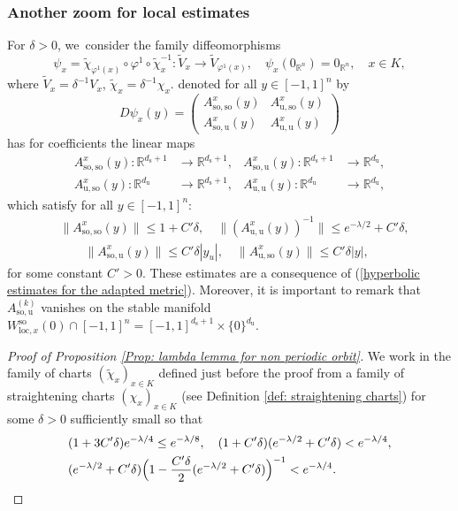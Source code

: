 \documentclass[11pt]{article}
\newcommand{\loc}{\mathrm{loc}}
\newcommand{\rs}{\mathrm{s}}
\newcommand{\rso}{\mathrm{so}}
\newcommand{\ru}{\mathrm{u}}
\theoremstyle{definition}
\theoremstyle{plain}
\newcommand{\R}{\mathbb{R}}
\begin{document}
\begin{appendix}
\subsubsection*{Another zoom for local estimates}
For $\delta > 0$, we~consider the family diffeomorphisms
\[
\psi_{x} = \widetilde{\chi}_{\varphi^1 (x)} \circ \varphi^1 \circ \widetilde{\chi}_x^{-1}: \widetilde{V}_x \to \widetilde{V}_{\varphi^1 (x)}, \quad \psi_{x} (0_{\R^n}) = 0_{\R^n}, \quad x \in K,
\]
where $\widetilde{V}_{x}= \delta^{-1} V_x$, $\widetilde{\chi}_x = \delta^{-1} \chi_x$.
denoted for all $y \in [-1,1]^n$ by
\[
D \psi_{x} (y) = \begin{pmatrix}
A_{\rso,\rso}^{x} (y) & A_{\ru,\rso}^{x} (y) \\
A_{\rso,\ru}^{x} (y) & A_{\ru,\ru}^{x} (y)
\end{pmatrix}
\]
has for coefficients the linear maps
\begin{align*}
A_{\rso,\rso}^{x} (y): \R^{d_\rs + 1} &\to \R^{d_\rs + 1},& A_{\rso,\ru}^{x} (y): \R^{d_\rs + 1} &\to \R^{d_\ru},\\
A_{\ru,\rso}^{x} (y): \R^{d_\ru} &\to \R^{d_\rs + 1},& A_{\ru,\ru}^{x} (y): \R^{d_\ru} &\to \R^{d_\ru},
\end{align*}
which satisfy for all $y \in [-1,1]^n$:
\begin{equation}\label{eq: appendix, estimates differential in adapted chart}
\begin{split}
& \| A_{\rso,\rso}^{x} (y) \|\leq 1 + C' \delta, \quad \| (A_{\ru,\ru}^{x} (y))^{-1} \| \leq e^{- \lambda/2} + C' \delta,\\
&\qquad \| A_{\rso,\ru}^{x} (y) \| \leq C' \delta |y_u|, \quad \| A_{\ru,\rso}^{x} (y) \| \leq C' \delta |y|,
\end{split}
\end{equation}
for some constant $C' > 0$. These estimates are a consequence of (\ref{hyperbolic estimates for the adapted metric}). Moreover, it is important to remark that $A_{\rso,\ru}^{(k)}$ vanishes on the stable manifold $W_{\loc,x}^{\rso} (0) \cap [-1,1]^n = [-1,1]^{d_\rs + 1} \times \{0\}^{d_\ru}$.

\begin{proof}[Proof of Proposition \ref{Prop: lambda lemma for non periodic orbit}]
We work in the family of charts $(\widetilde{\chi}_x)_{x \in K}$ defined just before the proof from a family of straightening charts $(\chi_x)_{x \in K}$ (see Definition \ref{def: straightening charts}) for some $\delta > 0$ sufficiently small so that
\begin{equation}\label{eq: estimees delta preuve lambda lemma}
\begin{split}
&(1 + 3 C' \delta) e^{- \lambda / 4} \leq e^{- \lambda /8}, \quad (1 + C' \delta) (e^{- \lambda/2 } + C' \delta) < e^{- \lambda / 4}, \\
&(e^{-\lambda/ 2} + C' \delta) \Bigl(1 - \frac{C' \delta}{2} (e^{- \lambda/ 2} + C' \delta) \Bigr)^{-1} < e^{- \lambda / 4}.
\end{split}
\end{equation}


\end{proof}
\end{appendix}
\end{document}
